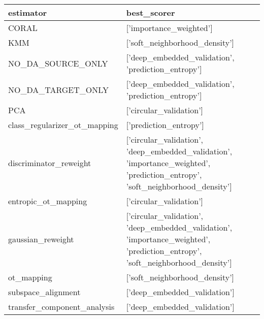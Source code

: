 \begin{tabular}{ll}
\hline
 estimator                    & best\_scorer                                                                                                                   \\
\hline
 CORAL                        & ['importance\_weighted']                                                                                                       \\
 KMM                          & ['soft\_neighborhood\_density']                                                                                                 \\
 NO\_DA\_SOURCE\_ONLY            & ['deep\_embedded\_validation', 'prediction\_entropy']                                                                            \\
 NO\_DA\_TARGET\_ONLY            & ['deep\_embedded\_validation', 'prediction\_entropy']                                                                            \\
 PCA                          & ['circular\_validation']                                                                                                       \\
 class\_regularizer\_ot\_mapping & ['prediction\_entropy']                                                                                                        \\
 discriminator\_reweight       & ['circular\_validation', 'deep\_embedded\_validation', 'importance\_weighted', 'prediction\_entropy', 'soft\_neighborhood\_density'] \\
 entropic\_ot\_mapping          & ['circular\_validation']                                                                                                       \\
 gaussian\_reweight            & ['circular\_validation', 'deep\_embedded\_validation', 'importance\_weighted', 'prediction\_entropy', 'soft\_neighborhood\_density'] \\
 ot\_mapping                   & ['soft\_neighborhood\_density']                                                                                                 \\
 subspace\_alignment           & ['deep\_embedded\_validation']                                                                                                  \\
 transfer\_component\_analysis  & ['deep\_embedded\_validation']                                                                                                  \\
\hline
\end{tabular}